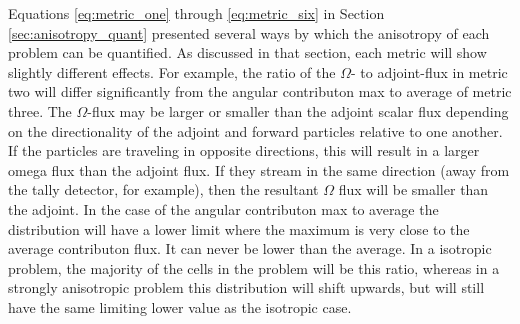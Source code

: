 
Equations \eqref{eq:metric_one} through \eqref{eq:metric_six} in
Section \ref{sec:anisotropy_quant} presented several ways by which the
anisotropy of each problem can be quantified. As discussed in that section,
each metric will show slightly different effects. For example, the ratio of the
$\Omega$- to adjoint-flux in metric two will differ significantly from the
angular contributon max to average of metric three. The $\Omega$-flux
may be larger or smaller than the adjoint scalar flux depending on the
directionality of the adjoint and forward particles relative to one another. If
the particles are traveling in opposite directions, this will result in a
larger omega flux than the adjoint flux. If they stream in the same direction
(away from the tally detector, for example),
then the resultant $\Omega$ flux will be smaller than the adjoint. In the case
of the angular contributon max to average the distribution will have a lower
limit where the maximum is very close to the average contributon flux. It can
never be lower than the average. In a isotropic problem, the majority of the
cells in the problem will be this ratio, whereas in a strongly anisotropic
problem this distribution will shift upwards, but will still have the same
limiting lower value as the isotropic case.



